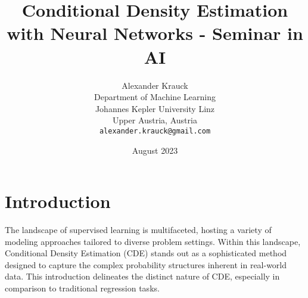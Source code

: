 \documentclass{article}
\title{Conditional Density Estimation with Neural Networks - Seminar in AI}
\author{%
  Alexander Krauck \\
  Department of Machine Learning\\
  Johannes Kepler University Linz\\
  Upper Austria, Austria \\
  \texttt{alexander.krauck@gmail.com}
}
\date{August 2023}
\begin{document}
\maketitle

\section{Introduction}\label{sec:introduction}

The landscape of supervised learning is multifaceted, hosting a variety of modeling approaches tailored to diverse problem settings. Within this landscape, Conditional Density Estimation (CDE) stands out as a sophisticated method designed to capture the complex probability structures inherent in real-world data. This introduction delineates the distinct nature of CDE, especially in comparison to traditional regression tasks.
\end{document}

